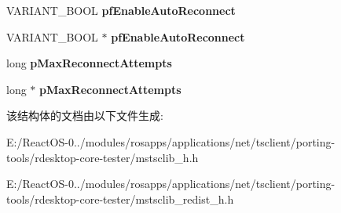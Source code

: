 \begin{DoxyCompactItemize}
V\+A\+R\+I\+A\+N\+T\+\_\+\+B\+O\+OL {\bfseries pf\+Enable\+Auto\+Reconnect}
\item 
\mbox{\label{struct_i_ms_rdp_client_advanced_settings2_vtbl_a062387c84cbdbc675df8d2b9d6bd7b68}} 
V\+A\+R\+I\+A\+N\+T\+\_\+\+B\+O\+OL $\ast$ {\bfseries pf\+Enable\+Auto\+Reconnect}
\item 
\mbox{\label{struct_i_ms_rdp_client_advanced_settings2_vtbl_a8dfc3c7536e1041095f0e74670068096}} 
long {\bfseries p\+Max\+Reconnect\+Attempts}
\item 
\mbox{\label{struct_i_ms_rdp_client_advanced_settings2_vtbl_ae9ef9116a8e42a89a0b54af2a0dabfa5}} 
long $\ast$ {\bfseries p\+Max\+Reconnect\+Attempts}
\end{DoxyCompactItemize}


该结构体的文档由以下文件生成\+:\begin{DoxyCompactItemize}
\item 
E\+:/\+React\+O\+S-\/0../modules/rosapps/applications/net/tsclient/porting-\/tools/rdesktop-\/core-\/tester/mstsclib\+\_\+h.\+h\item 
E\+:/\+React\+O\+S-\/0../modules/rosapps/applications/net/tsclient/porting-\/tools/rdesktop-\/core-\/tester/mstsclib\+\_\+redist\+\_\+h.\+h\end{DoxyCompactItemize}
